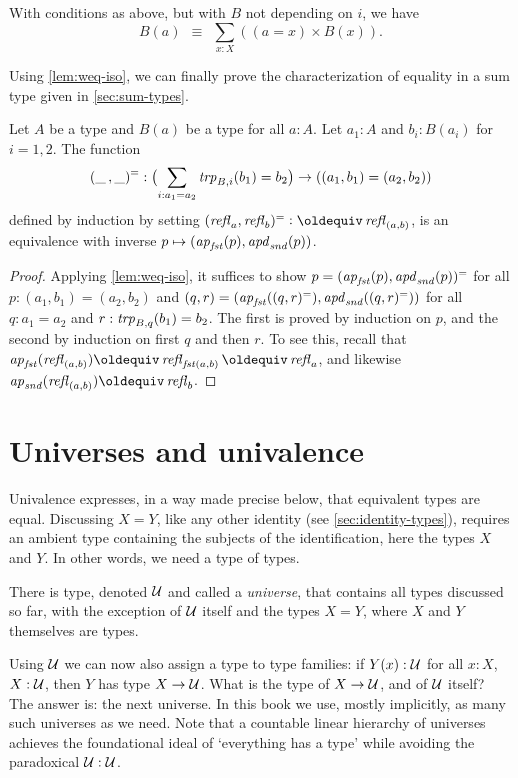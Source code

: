 \begin{corollary}\label{cor:contract-away}
With conditions as above, but with $B$ not depending on $i$, we have
\[
 B(a)~~\equiv~~\sum_{x:X} ((a=x)\times B(x)).
\]
\end{corollary}

Using \cref{lem:weq-iso}, we can finally prove the characterization of equality 
in a sum type given in \cref{sec:sum-types}.  

\begin{lemma}\label{lem:isEq-pair=}
Let $A$ be a type and $B(a)$ be a type for all $a:A$.
Let $a_1:A$ and $b_i:B(a_i)$ for $i=1,2$. The function 
\[
(\_\,,\_)^= : 
\bigl(\sum_{i:a_1 = a_2} \mathord{\mathit{trp}}_{B,i}(b_1)= b_2\bigr) \to ((a_1,b_1)=(a_2,b_2))
\] 
defined by induction by setting $(\refl{a},\refl{b})^= \defeq \refl{(a,b)}$, 
is an equivalence with inverse $p \mapsto (\mathop{{\it ap}_{\mathop{\mathit{fst}}}}(p),\mathop{{\it apd}_{\mathop{\mathit{snd}}}}(p))$.
\end{lemma}
\begin{proof}
Applying \cref{lem:weq-iso}, it suffices to show
$p=(\mathop{{\it ap}_{\mathop{\mathit{fst}}}}(p),\mathop{{\it apd}_{\mathop{\mathit{snd}}}}(p))^=$ for all $p:(a_1,b_1)=(a_2,b_2)$ and
$(q,r)=(\mathop{{\it ap}_{\mathop{\mathit{fst}}}}((q,r)^=),\mathop{{\it apd}_{\mathop{\mathit{snd}}}}((q,r)^=))$ for all $q:a_1=a_2$
and $r:\mathord{\mathit{trp}}_{B,q}(b_1)=b_2$. The first is proved by induction on $p$, 
and the second by induction on first $q$ and then $r$. To see this,
recall that $\ap{\fst}(\refl{(a,b)})\jdeq\refl{\fst(a,b)}\jdeq\refl{a}$,
and likewise $\ap{\snd}(\refl{(a,b)})\jdeq\refl{b}$.
\end{proof}

\section{Universes and univalence}\label{sec:univax}

Univalence expresses, in a way made precise below, that
equivalent types are equal. Discussing $X = Y$, 
like any other identity (see \cref{sec:identity-types}),
requires an ambient type containing the subjects of the identification,
here the types $X$ and $Y$.
In other words, we need a type of types.

\begin{definition}\label{def:universe}
There is type, denoted $\mathcal{U}$ and called a \emph{universe}, that contains
all types discussed so far, with the exception of $\mathcal{U}$ itself and the types 
$X = Y$, where $X$ and $Y$ themselves are types.
\end{definition}

Using $\mathcal{U}$ we can now also assign a type to type families:
if $Y(x):\mathcal{U}$ for all $x:X$, $X:\mathcal{U}$, then $Y$ has type $X\to\mathcal{U}$.
What is the type of $X\to\mathcal{U}$, and of $\mathcal{U}$ itself?
The answer is: the next universe.
In this book we use, mostly implicitly, as many such universes as we need.
Note that a countable linear hierarchy of universes achieves
the foundational ideal of `everything has a type' while
avoiding the paradoxical $\mathcal{U}:\mathcal{U}$.


